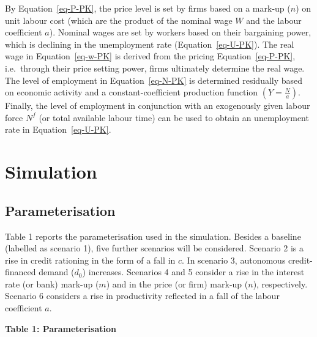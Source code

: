 \documentclass[
  letterpaper,
  DIV=11,
  numbers=noendperiod]{scrreprt}
\begin{document}
By Equation~\ref{eq-P-PK}, the price level is set by firms based on a
mark-up (\(n\)) on unit labour cost (which are the product of the
nominal wage \(W\) and the labour coefficient \(a\)). Nominal wages are
set by workers based on their bargaining power, which is declining in
the unemployment rate (Equation~\ref{eq-U-PK}). The real wage in
Equation~\ref{eq-w-PK} is derived from the pricing
Equation~\ref{eq-P-PK}, i.e.~through their price setting power, firms
ultimately determine the real wage. The level of employment in
Equation~\ref{eq-N-PK} is determined residually based on economic
activity and a constant-coefficient production function
\((Y=\frac{N}{a})\). Finally, the level of employment in conjunction
with an exogenously given labour force \(N^f\) (or total available
labour time) can be used to obtain an unemployment rate in
Equation~\ref{eq-U-PK}.

\section{Simulation}\label{simulation-3}

\subsection{Parameterisation}\label{parameterisation-3}

Table 1 reports the parameterisation used in the simulation. Besides a
baseline (labelled as scenario 1), five further scenarios will be
considered. Scenario 2 is a rise in credit rationing in the form of a
fall in \(c\). In scenario 3, autonomous credit-financed demand
(\(d_0\)) increases. Scenarios 4 and 5 consider a rise in the interest
rate (or bank) mark-up (\(m\)) and in the price (or firm) mark-up
(\(n\)), respectively. Scenario 6 considers a rise in productivity
reflected in a fall of the labour coefficient \(a\).

\textbf{Table 1: Parameterisation}
\end{document}
